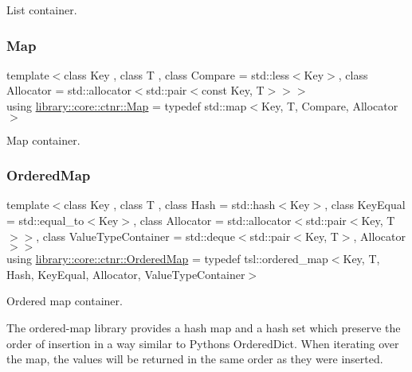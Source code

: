 List container. 

\mbox{\label{namespacelibrary_1_1core_1_1ctnr_a248e088a0b4ec44aff451a5c3663dcee}} 
\subsubsection{\texorpdfstring{Map}{Map}}
{\footnotesize\ttfamily template$<$class Key , class T , class Compare  = std\+::less$<$\+Key$>$, class Allocator  = std\+::allocator$<$std\+::pair$<$const Key, T$>$$>$$>$ \\
using \hyperlink{namespacelibrary_1_1core_1_1ctnr_a248e088a0b4ec44aff451a5c3663dcee}{library\+::core\+::ctnr\+::\+Map} = typedef std\+::map$<$Key, T, Compare, Allocator$>$}



Map container. 

\mbox{\label{namespacelibrary_1_1core_1_1ctnr_a1c0809231c3bc9fccce602bd7941a36b}} 
\subsubsection{\texorpdfstring{Ordered\+Map}{OrderedMap}}
{\footnotesize\ttfamily template$<$class Key , class T , class Hash  = std\+::hash$<$\+Key$>$, class Key\+Equal  = std\+::equal\+\_\+to$<$\+Key$>$, class Allocator  = std\+::allocator$<$std\+::pair$<$\+Key, T$>$$>$, class Value\+Type\+Container  = std\+::deque$<$std\+::pair$<$\+Key, T$>$, Allocator$>$$>$ \\
using \hyperlink{namespacelibrary_1_1core_1_1ctnr_a1c0809231c3bc9fccce602bd7941a36b}{library\+::core\+::ctnr\+::\+Ordered\+Map} = typedef tsl\+::ordered\+\_\+map$<$Key, T, Hash, Key\+Equal, Allocator, Value\+Type\+Container$>$}



Ordered map container. 

The ordered-\/map library provides a hash map and a hash set which preserve the order of insertion in a way similar to Python\textquotesingle{}s Ordered\+Dict. When iterating over the map, the values will be returned in the same order as they were inserted.

